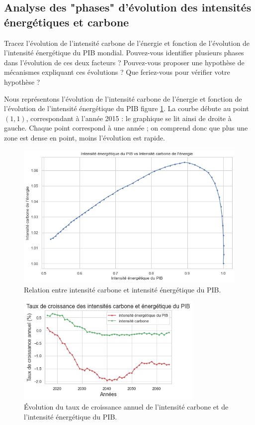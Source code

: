 \documentclass[a4,11pt]{aleph-notas}
\newcommand{\ans}[1]{
\begin{mdframed}[
    roundcorner=10pt,     %
    backgroundcolor=gray!20, %
    linecolor=black,      %
    linewidth=1pt,        %
    innertopmargin=10pt,  %
    innerbottommargin=10pt, %
    innerleftmargin=10pt,  %
    innerrightmargin=10pt  %
]
#1
\end{mdframed}
}
\begin{document}
\subsection{Analyse des "phases" d'évolution des intensités énergétiques et carbone}

\ans{Tracez l’évolution de l’intensité carbone de l’énergie et fonction de l’évolution de l’intensité énergétique du PIB mondial. Pouvez-vous identifier plusieurs phases dans l’évolution de ces deux facteurs ? Pouvez-vous proposer une hypothèse de mécanismes expliquant ces évolutions ? Que feriez-vous pour vérifier votre hypothèse ?}

Nous représentons l’évolution de l’intensité carbone de l’énergie et fonction de l’évolution de l’intensité énergétique du PIB figure \ref{fig:intensites}. La courbe débute au point $(1,1)$, correspondant à l'année 2015 : le graphique se lit ainsi de droite à gauche. Chaque point correspond à une année ; on comprend donc que plus une zone est dense en point, moins l'évolution est rapide.

\begin{figure}[H]
    \centering
    \includegraphics[width=\textwidth]{images_IMACLIM/intensites_baseline.png}
    \caption{Relation entre intensité carbone et intensité énergétique du PIB.}
    \label{fig:intensites}
\end{figure}

\begin{figure}[H]
    \centering
    \includegraphics[width=0.8\textwidth]{images_IMACLIM/croissance_intensites.png}
    \caption{Évolution du taux de croissance annuel de l'intensité carbone et de l'intensité énergétique du PIB.}
    \label{fig:croissance_intensites}
\end{figure}
\end{document}
